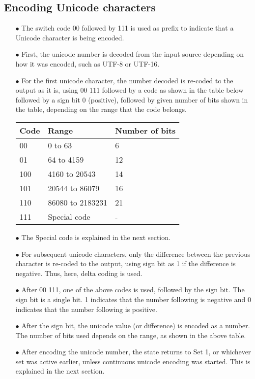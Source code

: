 \documentclass[]{article}
\begin{document}
	\subsection{Encoding Unicode characters}
	\begin{itemize}
		\item[$\bullet$] The switch code 00 followed by 111 is used as prefix to indicate that a Unicode character is being encoded.
		\item[$\bullet$] First, the unicode number is decoded from the input source depending on how it was encoded, such as UTF-8 or UTF-16.
		\item[$\bullet$] For the first unicode character, the number decoded is re-coded to the output as it is, using 00 111 followed by a code as shown in the table below followed by a sign bit 0 (positive), followed by given number of bits shown in the table, depending on the range that the code belongs.
		\item[] \begin{tabular}{ | l | l | l |} \hline
			\textbf{Code} & \textbf{Range} & \textbf{Number of bits} \\ \hline
			00 & 0 to 63 & 6 \\ \hline
			01 & 64 to 4159 & 12 \\ \hline
			100 & 4160 to 20543 & 14 \\ \hline
			101 & 20544 to 86079 & 16 \\ \hline
			110 & 86080 to 2183231 & 21 \\ \hline
			111 & Special code & - \\ \hline
		\end{tabular}
		\item[$\bullet$] The Special code is explained in the next section.
		\item[$\bullet$] For subsequent unicode characters, only the difference between the previous character is re-coded to the output, using sign bit as 1 if the difference is negative. Thus, here, delta coding is used.
		\item[$\bullet$] After 00 111, one of the above codes is used, followed by the sign bit. The sign bit is a single bit. 1 indicates that the number following is negative and 0 indicates that the number following is positive.
		\item[$\bullet$] After the sign bit, the unicode value (or difference) is encoded as a number. The number of bits used depends on the range, as shown in the above table.
		\item[$\bullet$] After encoding the unicode number, the state returns to Set 1, or whichever set was active earlier, unless continuous unicode encoding was started. This is explained in the next section.
	\end{itemize}
	
\end{document}
